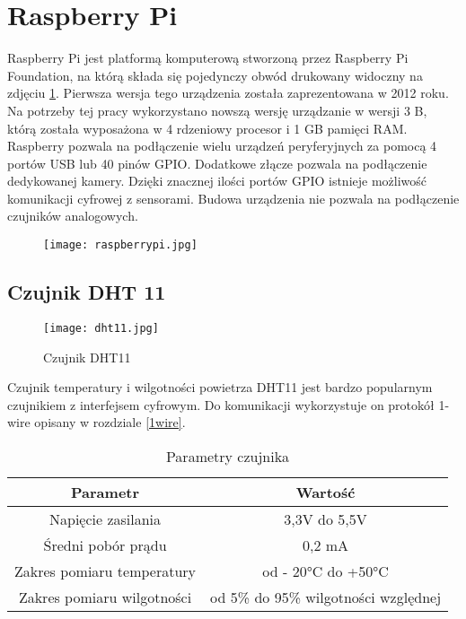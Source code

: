 \section{Raspberry Pi} \label{raspi}
Raspberry Pi \cite{raspberry} jest platformą komputerową stworzoną przez Raspberry Pi Foundation, na którą składa się pojedynczy obwód drukowany widoczny na zdjęciu \ref{fig:raspberrypi}. Pierwsza wersja tego urządzenia została zaprezentowana w 2012 roku. Na potrzeby tej pracy wykorzystano nowszą wersję urządzanie w wersji 3 B, którą została wyposażona w 4 rdzeniowy procesor i 1 GB pamięci RAM. Raspberry pozwala na podłączenie wielu urządzeń peryferyjnych za pomocą 4 portów USB lub 40 pinów GPIO. Dodatkowe złącze pozwala na podłączenie dedykowanej kamery. Dzięki znacznej ilości portów GPIO istnieje możliwość komunikacji cyfrowej z sensorami. Budowa urządzenia nie pozwala na podłączenie czujników analogowych.
\begin{figure}[H]
	\centering
	\texttt{[image: raspberrypi.jpg]}
	\label{fig:raspberrypi}
\end{figure}

\subsection{Czujnik DHT 11}
\begin{figure}[H]
	\centering
	\texttt{[image: dht11.jpg]}
	\caption{Czujnik DHT11}
	\label{fig:dht11}
\end{figure}
Czujnik temperatury i wilgotności powietrza DHT11 jest bardzo popularnym czujnikiem z interfejsem cyfrowym. Do komunikacji wykorzystuje on protokół 1-wire opisany w rozdziale \ref{1wire}.
\begin{table}[H]
	\centering
	\caption{Parametry czujnika}
	\begin{tabular}{|c|c|}
  		\hline 
  		\bfseries Parametr & \bfseries Wartość \\
  		\hline
  		Napięcie zasilania & 3,3V do 5,5V\\
  		\hline
  		Średni pobór prądu & 0,2 mA\\
  		\hline 
  		Zakres pomiaru temperatury & od - 20\si{\degree}C do +50\si{\degree}C\\
  		\hline 
  		Zakres pomiaru wilgotności & od 5\% do 95\% wilgotności względnej\\
  		\hline 
  	\end{tabular}
\end{table}

